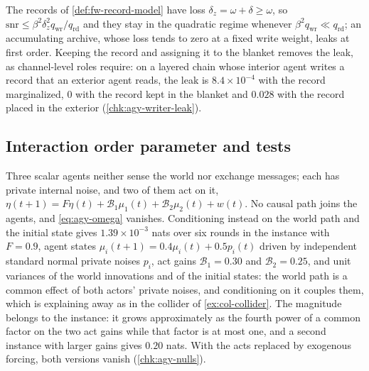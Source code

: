 The records of \cref{def:fw-record-model} have loss $\delta_z=\omega+\delta\ge\omega$, so $\mathrm{snr}\le\beta^2\delta_z^2q_{\mathrm{wr}}/q_{\mathrm{rd}}$ and they stay in the quadratic regime whenever $\beta^2q_{\mathrm{wr}}\ll q_{\mathrm{rd}}$; an accumulating archive, whose loss tends to zero at a fixed write weight, leaks at first order. Keeping the record and assigning it to the blanket removes the leak, as channel-level roles require: on a layered chain whose interior agent writes a record that an exterior agent reads, the leak is $8.4\times10^{-4}$ with the record marginalized, $0$ with the record kept in the blanket and $0.028$ with the record placed in the exterior (\cref{chk:agy-writer-leak}).

\subsection{Interaction order parameter and tests}\label{sup:agy-interaction-order-parameter-and-tests}

\begin{example}\label{ex:agy-collider}
Three scalar agents neither sense the world nor exchange messages; each has private internal noise, and two of them act on it, $\eta(t+1)=F\eta(t)+\mathcal B_1\mu_1(t)+\mathcal B_2\mu_2(t)+w(t)$. No causal path joins the agents, and \eqref{eq:agy-omega} vanishes. Conditioning instead on the world path and the initial state gives $1.39\times10^{-3}$ nats over six rounds in the instance with $F=0.9$, agent states $\mu_i(t+1)=0.4\mu_i(t)+0.5p_i(t)$ driven by independent standard normal private noises $p_i$, act gains $\mathcal B_1=0.30$ and $\mathcal B_2=0.25$, and unit variances of the world innovations and of the initial states: the world path is a common effect of both actors' private noises, and conditioning on it couples them, which is explaining away as in the collider of \cref{ex:col-collider}. The magnitude belongs to the instance: it grows approximately as the fourth power of a common factor on the two act gains while that factor is at most one, and a second instance with larger gains gives $0.20$ nats. With the acts replaced by exogenous forcing, both versions vanish (\cref{chk:agy-nulls}).
\end{example}

